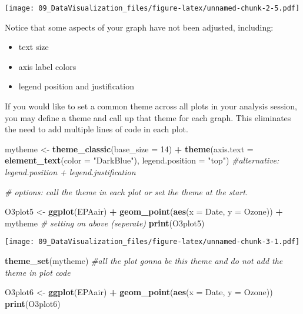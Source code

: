 \documentclass[]{article}
\newenvironment{Shaded}{\begin{snugshade}}{\end{snugshade}}
\newcommand{\CommentTok}[1]{\textcolor[rgb]{0.56,0.35,0.01}{\textit{#1}}}
\newcommand{\DataTypeTok}[1]{\textcolor[rgb]{0.13,0.29,0.53}{#1}}
\newcommand{\DecValTok}[1]{\textcolor[rgb]{0.00,0.00,0.81}{#1}}
\newcommand{\KeywordTok}[1]{\textcolor[rgb]{0.13,0.29,0.53}{\textbf{#1}}}
\newcommand{\NormalTok}[1]{#1}
\newcommand{\OperatorTok}[1]{\textcolor[rgb]{0.81,0.36,0.00}{\textbf{#1}}}
\newcommand{\StringTok}[1]{\textcolor[rgb]{0.31,0.60,0.02}{#1}}
\providecommand{\tightlist}{%
  \setlength{\itemsep}{0pt}\setlength{\parskip}{0pt}}
\begin{document}
\texttt{[image: 09\_DataVisualization\_files/figure-latex/unnamed-chunk-2-5.pdf]}

Notice that some aspects of your graph have not been adjusted,
including:

\begin{itemize}
\tightlist
\item
  text size
\item
  axis label colors
\item
  legend position and justification
\end{itemize}

If you would like to set a common theme across all plots in your
analysis session, you may define a theme and call up that theme for each
graph. This eliminates the need to add multiple lines of code in each
plot.

\begin{Shaded}
\begin{Highlighting}[]
\NormalTok{mytheme <-}\StringTok{ }\KeywordTok{theme_classic}\NormalTok{(}\DataTypeTok{base_size =} \DecValTok{14}\NormalTok{) }\OperatorTok{+}
\StringTok{  }\KeywordTok{theme}\NormalTok{(}\DataTypeTok{axis.text =} \KeywordTok{element_text}\NormalTok{(}\DataTypeTok{color =} \StringTok{"DarkBlue"}\NormalTok{), }
        \DataTypeTok{legend.position =} \StringTok{"top"}\NormalTok{) }\CommentTok{#alternative: legend.position + legend.justification}

\CommentTok{# options: call the theme in each plot or set the theme at the start. }

\NormalTok{O3plot5 <-}\StringTok{ }\KeywordTok{ggplot}\NormalTok{(EPAair) }\OperatorTok{+}
\StringTok{  }\KeywordTok{geom_point}\NormalTok{(}\KeywordTok{aes}\NormalTok{(}\DataTypeTok{x =}\NormalTok{ Date, }\DataTypeTok{y =}\NormalTok{ Ozone)) }\OperatorTok{+}
\StringTok{  }\NormalTok{mytheme  }\CommentTok{# setting on above (seperate)}
\KeywordTok{print}\NormalTok{(O3plot5)  }
\end{Highlighting}
\end{Shaded}

\texttt{[image: 09\_DataVisualization\_files/figure-latex/unnamed-chunk-3-1.pdf]}

\begin{Shaded}
\begin{Highlighting}[]
\KeywordTok{theme_set}\NormalTok{(mytheme) }\CommentTok{#all the plot gonna be this theme and do not add the theme in plot code}

\NormalTok{O3plot6 <-}\StringTok{ }\KeywordTok{ggplot}\NormalTok{(EPAair) }\OperatorTok{+}
\StringTok{  }\KeywordTok{geom_point}\NormalTok{(}\KeywordTok{aes}\NormalTok{(}\DataTypeTok{x =}\NormalTok{ Date, }\DataTypeTok{y =}\NormalTok{ Ozone))}
\KeywordTok{print}\NormalTok{(O3plot6)  }
\end{Highlighting}
\end{Shaded}
\end{document}
